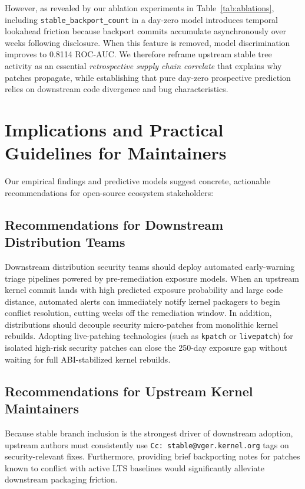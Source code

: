 \documentclass[final,5p,times,twocolumn]{elsarticle}
\begin{document}
However, as revealed by our ablation experiments in Table~\ref{tab:ablations}, including \texttt{stable\_backport\_count} in a day-zero model introduces temporal lookahead friction because backport commits accumulate asynchronously over weeks following disclosure. When this feature is removed, model discrimination improves to 0.8114 ROC-AUC. We therefore reframe upstream stable tree activity as an essential \textit{retrospective supply chain correlate} that explains why patches propagate, while establishing that pure day-zero prospective prediction relies on downstream code divergence and bug characteristics.

\section{Implications and Practical Guidelines for Maintainers}
\label{sec:guidelines}

Our empirical findings and predictive models suggest concrete, actionable recommendations for open-source ecosystem stakeholders:

\subsection{Recommendations for Downstream Distribution Teams}
Downstream distribution security teams should deploy automated early-warning triage pipelines powered by pre-remediation exposure models. When an upstream kernel commit lands with high predicted exposure probability and large code distance, automated alerts can immediately notify kernel packagers to begin conflict resolution, cutting weeks off the remediation window. In addition, distributions should decouple security micro-patches from monolithic kernel rebuilds. Adopting live-patching technologies (such as \texttt{kpatch} or \texttt{livepatch}) for isolated high-risk security patches can close the 250-day exposure gap without waiting for full ABI-stabilized kernel rebuilds.

\subsection{Recommendations for Upstream Kernel Maintainers}
Because stable branch inclusion is the strongest driver of downstream adoption, upstream authors must consistently use \texttt{Cc: stable@vger.kernel.org} tags on security-relevant fixes. Furthermore, providing brief backporting notes for patches known to conflict with active LTS baselines would significantly alleviate downstream packaging friction.
\end{document}
